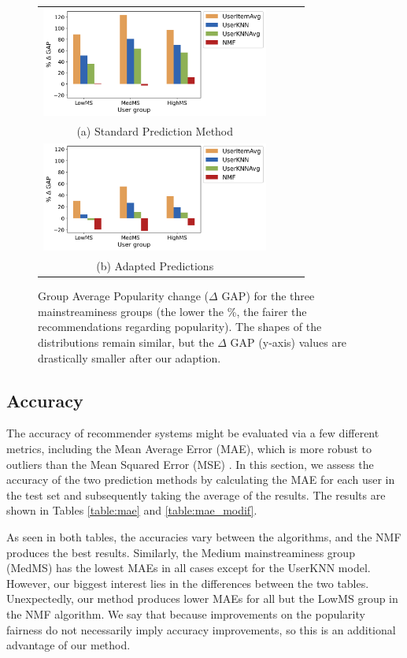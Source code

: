 \documentclass{article}
\begin{document}
\begin{figure}[ht]
\centering
\begin{tabular}{cccc}
  \includegraphics[width=75mm]{img/gap_analysis_28.png} \\
(a) Standard Prediction Method  \\[6pt]
  \includegraphics[width=75mm]{img/gap_analysis_modif_2.png} \\
(b) Adapted Predictions  \\[6pt]
\end{tabular}
\caption{Group Average Popularity change ($\Delta$ GAP)  
for  the three mainstreaminess groups (the lower the \%, the 
fairer the recommendations regarding popularity). 
The shapes of the distributions remain similar, but the  
$\Delta$ GAP (y-axis) values are drastically smaller 
after our adaption.}
\label{fig:gap}
\end{figure}

\subsection{Accuracy}\label{sec:pop_cluster}

The accuracy of recommender systems might be
evaluated via a few different
metrics, including the Mean Average Error (MAE),
which is more robust to outliers than the Mean Squared Error 
(MSE) \cite{willmott2005advantages}. In this section, we
assess the accuracy of the two prediction methods by calculating the MAE
for each user in the test set and subsequently taking the average 
of the results. The results are shown in Tables \ref{table:mae} and
\ref{table:mae_modif}. 

As seen in both tables, the accuracies vary between the algorithms, 
and the NMF produces the best results. Similarly, the Medium
mainstreaminess group (MedMS) has the lowest MAEs in all cases except 
for the UserKNN model. However, our biggest interest lies in
the differences between the two tables. Unexpectedly, our method
produces lower MAEs for all but the LowMS group in the NMF algorithm. We say that because improvements on the popularity
fairness do not necessarily imply accuracy improvements, 
so this is an additional advantage of our method. 
\end{document}
